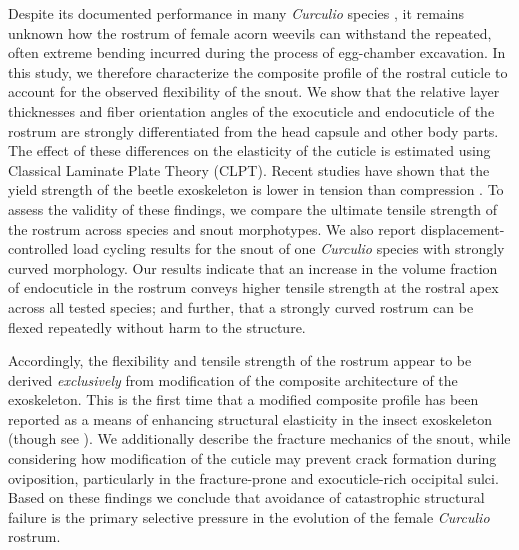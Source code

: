 \documentclass[twocolumn, linenumbers, superscriptaddress, nofootinbib]{revtex4-1}
\begin{document}
	Despite its documented performance in many \textit{Curculio} species \cite{Gibson1969, Moffett1989, AguirreUribe1978, Toju2005}, it remains unknown how the rostrum of female acorn weevils can withstand the repeated, often extreme bending incurred during the process of egg-chamber excavation.
	In this study, we therefore characterize the composite profile of the rostral cuticle to account for the observed flexibility of the snout.
	We show that the relative layer thicknesses and fiber orientation angles of the exocuticle and endocuticle of the rostrum are strongly differentiated from the head capsule and other body parts.
	The effect of these differences on the elasticity of the cuticle is estimated using Classical Laminate Plate Theory (CLPT).
	Recent studies have shown that the yield strength of the beetle exoskeleton is lower in tension than compression \cite{Longhai2017}.
	To assess the validity of these findings, we compare the ultimate tensile strength of the rostrum across species and snout morphotypes.
	We also report displacement-controlled load cycling results for the snout of one \textit{Curculio} species with strongly curved morphology.
	Our results indicate that an increase in the volume fraction of endocuticle in the rostrum conveys higher tensile strength at the rostral apex across all tested species; and further, that a strongly curved rostrum can be flexed repeatedly without harm to the structure.
	
	Accordingly, the flexibility and tensile strength of the rostrum appear to be derived \emph{exclusively} from modification of the composite architecture of the exoskeleton.
	This is the first time that a modified composite profile has been reported as a means of enhancing structural elasticity in the insect exoskeleton (though see \cite{Matsumura2017}).
	We additionally describe the fracture mechanics of the snout, while considering how modification of the cuticle may prevent crack formation during oviposition, particularly in the fracture-prone and exocuticle-rich occipital sulci.
	Based on these findings we conclude that avoidance of catastrophic structural failure is the primary selective pressure in the evolution of the female \textit{Curculio} rostrum.
	
	
\end{document}
